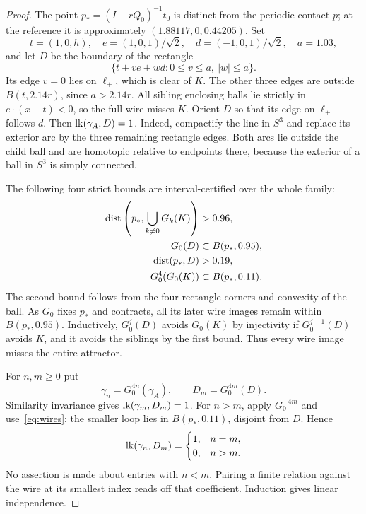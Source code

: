 \begin{proof}
The point $p_*=(I-rQ_0)^{-1}t_0$ is distinct from the periodic contact $p$;
at the reference it is approximately $(1.88117,0,0.44205)$. Set
\[
t=(1,0,h),\quad e=(1,0,1)/\sqrt2,\quad d=(-1,0,1)/\sqrt2,
\quad a=1.03,
\]
and let $D$ be the boundary of the rectangle
\[
\{t+ve+wd:0\le v\le a,\ |w|\le a\}.
\]
Its edge $v=0$ lies on $\ell_+$, which is clear of $K$.
The other three edges are outside $B(t,2.14r)$, since $a>2.14r$.
All sibling enclosing balls lie strictly in $e\cdot(x-t)<0$, so the full
wire misses $K$. Orient $D$ so that its edge on $\ell_+$ follows $d$.
Then $\operatorname{lk}(\gamma_A,D)=1$. Indeed, compactify the line in $S^3$ and replace
its exterior arc by the three remaining rectangle edges. Both arcs lie
outside the child ball and are homotopic relative to endpoints there,
because the exterior of a ball in $S^3$ is simply connected.

The following four strict bounds are interval-certified over the whole family:
\begin{equation}\label{eq:wires}
\begin{split}
\operatorname{dist}\left(p_*,\bigcup_{k\ne0}G_k(K)\right)&>0.96,\\
G_0(D)&\subset B(p_*,0.95),\\
\operatorname{dist}(p_*,D)&>0.19,\\
G_0^4(G_0(K))&\subset B(p_*,0.11).
\end{split}
\end{equation}
The second bound follows from the four rectangle corners and convexity of
the ball. As $G_0$ fixes $p_*$ and contracts, all its later wire images
remain within $B(p_*,0.95)$. Inductively, $G_0^j(D)$ avoids $G_0(K)$ by
injectivity if $G_0^{j-1}(D)$ avoids $K$, and it avoids the siblings by
the first bound. Thus every wire image misses the entire attractor.

For $n,m\ge0$ put
\[
\gamma_n=G_0^{4n}(\gamma_A),\qquad D_m=G_0^{4m}(D).
\]
Similarity invariance gives $\operatorname{lk}(\gamma_m,D_m)=1$. For $n>m$, apply
$G_0^{-4m}$ and use~\eqref{eq:wires}: the smaller loop lies in
$B(p_*,0.11)$, disjoint from $D$. Hence
\begin{equation}\label{eq:triangular}
\operatorname{lk}(\gamma_n,D_m)=
\begin{cases}1,&n=m,\\0,&n>m.\end{cases}
\end{equation}
No assertion is made about entries with $n<m$. Pairing a finite relation
against the wire at its smallest index reads off that coefficient.
Induction gives linear independence.


\end{proof}
